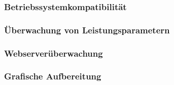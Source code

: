 \subsubsection{Betriebssystemkompatibilität}
\label{sec:EinpflegenServer}

\subsubsection{Überwachung von Leistungsparametern}
\label{sec:ÜberwachungLeistungsparameter}

\subsubsection{Webserverüberwachung}
\label{sec:ÜberwachungWebserver}

\subsubsection{Grafische Aufbereitung}
\label{sec:GrafischeAufbereitung}